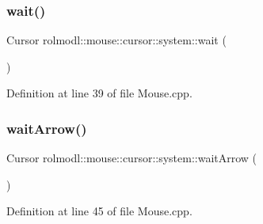 \subsubsection{\texorpdfstring{wait()}{wait()}}
{\footnotesize\ttfamily Cursor rolmodl\+::mouse\+::cursor\+::system\+::wait (\begin{DoxyParamCaption}{ }\end{DoxyParamCaption})}



Definition at line 39 of file Mouse.\+cpp.

\mbox{\label{namespacerolmodl_1_1mouse_1_1cursor_1_1system_af0c6beb57a2315683e24502b53b832d1}} 
\subsubsection{\texorpdfstring{waitArrow()}{waitArrow()}}
{\footnotesize\ttfamily Cursor rolmodl\+::mouse\+::cursor\+::system\+::wait\+Arrow (\begin{DoxyParamCaption}{ }\end{DoxyParamCaption})}



Definition at line 45 of file Mouse.\+cpp.

